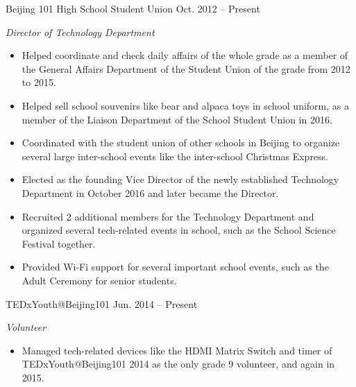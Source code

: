 \documentclass[hidelinks__VERSION__]{adamyi-cv}
\begin{document}
\begin{entrylist}


\entry
{Beijing 101 High School Student Union}
{Oct. 2012 -- Present}
{\emph{Director of Technology Department}
\begin{itemize}
\item Helped coordinate and check daily affairs of the whole grade as a member of the General Affairs Department of the Student Union of the grade from 2012 to 2015.
\item Helped sell school souvenirs like bear and alpaca toys in school uniform, as a member of the Liaison Department of the School Student Union in 2016.
\item Coordinated with the student union of other schools in Beijing to organize several large inter-school events like the inter-school Christmas Express.
\item Elected as the founding Vice Director of the newly established Technology Department in October 2016 and later became the Director.
\item Recruited 2 additional members for the Technology Department and organized several tech-related events in school, such as the School Science Festival together.
\item Provided Wi-Fi support for several important school events, such as the Adult Ceremony for senior students.
\end{itemize}}


\entry
{TEDxYouth@Beijing101}
{Jun. 2014 -- Present}
{\emph{Volunteer}
\begin{itemize}
\item Managed tech-related devices like the HDMI Matrix Switch and timer of TEDxYouth@Beijing101 2014 as the only grade 9 volunteer, and again in 2015.
\end{itemize}}


\end{entrylist}
\end{document}
